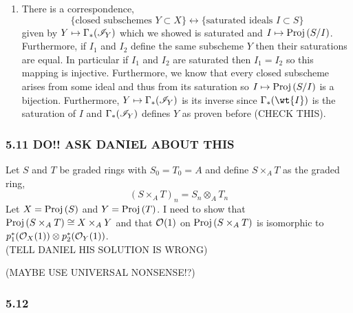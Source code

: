 \documentclass[12pt]{article}
\begin{document}
\begin{enumerate}
\item There is a correspondence,
\[ \{ \text{closed subschemes } Y \subset X \} \leftrightarrow \{ \text{saturated ideals } I \subset S \} \]
given by $Y \mapsto \Gamma_*(\mathscr{I}_Y)$ which we showed is saturated and $I \mapsto \mathrm{Proj}\left( S/I \right)$. Furthermore, if $I_1$ and $I_2$ define the same subscheme $Y$ then their saturations are equal. In particular if $I_1$ and $I_2$ are saturated then $I_1 = I_2$ so this mapping is injective. Furthermore, we know that every closed subscheme arises from some ideal and thus from its saturation so $I \mapsto \mathrm{Proj}\left( S/I \right)$ is a bijection. Furthermore, $Y \mapsto \Gamma_*(\mathscr{I}_Y)$ is its inverse since $\Gamma_*(\wt{I})$ is the saturation of $I$ and $\Gamma_*(\mathscr{I}_Y)$ defines $Y$ as proven before (CHECK THIS).
\end{enumerate}


\subsubsection{5.11 DO!! ASK DANIEL ABOUT THIS}

Let $S$ and $T$ be graded rings with $S_0 = T_0 = A$ and define $S \times_A T$ as the graded ring,
\[ (S \times_A T)_n = S_n \otimes_A T_n \]
Let $X = \mathrm{Proj}\left( S \right)$ and $Y = \mathrm{Proj}\left( T \right)$. I need to show that $\mathrm{Proj}\left( S \times_A T \right) \cong X \times_A Y$ and that $\mathcal{O}_{}(1)$ on $\mathrm{Proj}\left( S \times_A T \right)$ is isomorphic to $p_1^*(\mathcal{O}_{X}(1)) \otimes p_2^*(\mathcal{O}_{Y}(1))$. 
\bigskip\\
(TELL DANIEL HIS SOLUTION IS WRONG)

(MAYBE USE UNIVERSAL NONSENSE!?)

\subsubsection{5.12}
\end{document}
